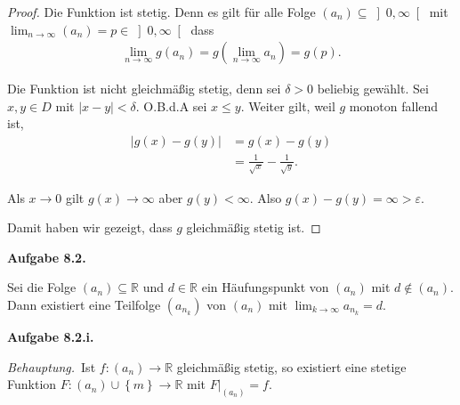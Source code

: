 \documentclass[12pt]{extarticle}
\newcommand{\beh}{\textit{Behauptung.}\ }
\newcommand{\aufgn}[1]{\textbf{Aufgabe #1.}}
\newcommand{\mg}[1]{\mathbb{#1}}
\begin{document}
\begin{proof}
  Die Funktion ist stetig.  Denn es gilt für alle Folge
  \((a_n) \subseteq \left]0, \infty\right[\) mit
  $\lim_{n \to \infty}{(a_n)}=p \in \left]0,
    \infty\right[$ dass
\begin{align*}
  \lim_{n \to \infty}{g(a_n)}
  = g \left(\lim_{n \to \infty}{a_n} \right) = g(p).
\end{align*}

Die Funktion ist nicht gleichmäßig stetig, denn sei
\(\delta > 0\) beliebig gewählt.  Sei \(x, y \in D\) mit
\(\left| x - y \right| < \delta\).  O.B.d.A sei
\(x \le y\).
Weiter gilt, weil \(g\) monoton fallend ist,
\begin{align*}
  \left| g(x) - g(y) \right|
  &= g(x) - g(y)  \\
  & =\frac{1}{\sqrt{x}} - \frac{1}{\sqrt{y}}.
\end{align*}

Als \(x \to 0\) gilt \(g(x) \to \infty\) aber
\(g(y) < \infty\).  Also
\(g(x) - g(y) = \infty > \varepsilon\).

Damit haben wir gezeigt, dass \(g\) gleichmäßig stetig
ist.
\end{proof}
\aufgn{8.2}

Sei die Folge \((a_n) \subseteq \mg{R}\) und
\(d \in \mg{R}\) ein Häufungspunkt von \((a_n)\) mit
\(d \notin (a_n)\).  Dann existiert eine Teilfolge
\((a_{n_k})\) von \((a_n)\) mit
\(\lim_{k \to \infty}{a_{n_k}} = d\).

\aufgn{8.2.i}

\beh Ist \(f \colon (a_n) \to \mg{R}\) gleichmäßig
stetig, so existiert eine stetige Funktion
\(F \colon (a_n) \cup \left\{ m \right\} \to \mg{R}\) mit
\(F\vert_{(a_n)}=f\).
\end{document}
